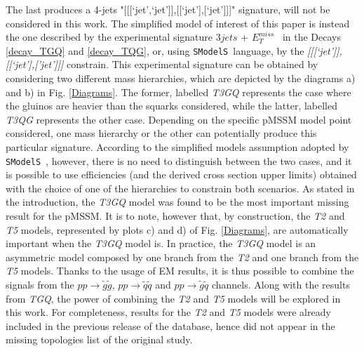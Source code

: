 \documentclass[preprint,number,sort&compress,twocolumn,3p]{elsstyarticle}
\newcommand{\MET}{{ $E_T ^{miss}$}}
\newcommand{\SMO}{\texttt{SModelS\xspace}}
\begin{document}
The last produces a 4-jets "[[[`jet',`jet']],[[`jet'],[`jet']]]" signature, will not be considered in this work. The simplified model of interest of this paper is instead the one described by the experimental signature $3jets$ + \MET~ in the Decays \ref{decay_TGQ} and \ref{decay_TQG}, or, using \SMO~language, by the \textit{[[[`jet']],[[`jet'],['jet']]]} constrain. This experimental signature can be obtained by considering two different mass hierarchies, which are depicted by the diagrams a) and b) in Fig. \ref{Diagrams}. The former, labelled \textit{T3GQ} represents the case where the gluinos are heavier than the squarks considered, while the latter, labelled \textit{T3QG} represents the other case. Depending on the specific pMSSM model point considered, one mass hierarchy or the other can potentially produce this particular signature. According to the simplified models assumption adopted by \SMO~, however, there is no need to distinguish between the two cases, and it is possible to use efficiencies (and the derived cross section upper limits) obtained with the choice of one of the hierarchies to constrain both scenarios. 
%
As stated in the introduction, the \textit{T3GQ} model was found to be the most important missing result for the pMSSM. It is to note, however that, by construction, the \textit{T2} and \textit{T5} models, represented by plots c) and d) of Fig. \ref{Diagrams}, are automatically important when the \textit{T3GQ} model is. In practice, the \textit{T3GQ} model is an asymmetric model composed by one branch from the \textit{T2} and one branch from the \textit{T5} models. Thanks to the usage of EM results, it is thus possible to combine the signals from the $pp \rightarrow \tilde g \tilde g$, $pp \rightarrow \tilde q \tilde q$ and $pp \rightarrow \tilde g \tilde q$ channels. Along with the results from \textit{TGQ}, the power of combining the \textit{T2} and \textit{T5} models will be explored in this work. For completeness, results for the \textit{T2} and \textit{T5} models were already included in the previous release of the database, hence did not appear in the missing topologies list of the original study.
\end{document}

